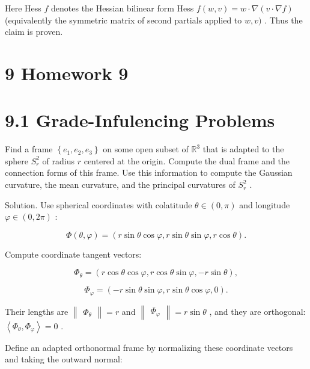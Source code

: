 \documentclass[10pt]{article}
\begin{document}
Here Hess \(f\) denotes the Hessian bilinear form Hess \(f\left( {w,v}\right)  = w \cdot  \nabla \left( {v \cdot  \nabla f}\right)\) (equivalently the symmetric matrix of second partials applied to \(w,v)\) . Thus the claim is proven.

\section*{9 Homework 9}

\section*{9.1 Grade-Infulencing Problems}

\begin{problem}[title=PROBLEM 1 (5 POINTS)]
Find a frame \(\left\{  {{e}_{1},{e}_{2},{e}_{3}}\right\}\) on some open subset of \({\mathbb{R}}^{3}\) that is adapted to the sphere \({S}_{r}^{2}\) of radius \(r\) centered at the origin. Compute the dual frame and the connection forms of this frame. Use this information to compute the Gaussian curvature, the mean curvature, and the principal curvatures of \({S}_{r}^{2}\) .
\end{problem}

Solution. Use spherical coordinates with colatitude \(\theta  \in  \left( {0,\pi }\right)\) and longitude \(\varphi  \in  \left( {0,{2\pi }}\right)\) :

\[
\Phi \left( {\theta ,\varphi }\right)  = \left( {r\sin \theta \cos \varphi ,r\sin \theta \sin \varphi ,r\cos \theta }\right) .
\]

Compute coordinate tangent vectors:

\[
{\Phi }_{\theta } = \left( {r\cos \theta \cos \varphi ,r\cos \theta \sin \varphi , - r\sin \theta }\right) ,
\]

\[
{\Phi }_{\varphi } = \left( {-r\sin \theta \sin \varphi ,r\sin \theta \cos \varphi ,0}\right) .
\]

Their lengths are \(\begin{Vmatrix}{\Phi }_{\theta }\end{Vmatrix} = r\) and \(\begin{Vmatrix}{\Phi }_{\varphi }\end{Vmatrix} = r\sin \theta\) , and they are orthogonal: \(\left\langle  {{\Phi }_{\theta },{\Phi }_{\varphi }}\right\rangle   = 0\) .

Define an adapted orthonormal frame by normalizing these coordinate vectors and taking the outward normal:
\end{document}
